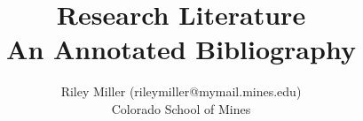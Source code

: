 \documentclass [11pt]{article}
\title{Research Literature\\\medskip An Annotated Bibliography}
\author{Riley Miller (rileymiller@mymail.mines.edu)\\Colorado School of Mines}
\begin{document}
\maketitle
\nocite{*}


\end{document}
